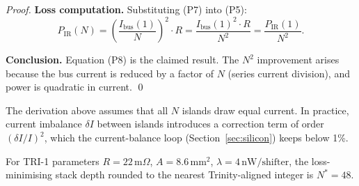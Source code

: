 \begin{proof}
\textbf{Loss computation.}
Substituting (P7) into (P5):
\[
  P_{\mathrm{IR}}(N) = \left(\frac{I_{\mathrm{bus}}(1)}{N}\right)^2 \cdot R
                     = \frac{I_{\mathrm{bus}}(1)^2 \cdot R}{N^2}
                     = \frac{P_{\mathrm{IR}}(1)}{N^2}. \tag{P8}
\]

\textbf{Conclusion.}
Equation (P8) is the claimed result.  The $N^2$ improvement arises
because the bus current is reduced by a factor of $N$ (series current
division), and power is quadratic in current.  \qed
\end{proof}

\begin{remark}
The derivation above assumes that all $N$ islands draw equal current.
In practice, current imbalance $\delta I$ between islands introduces a
correction term of order $(\delta I / I)^2$, which the current-balance
loop (Section~\ref{sec:silicon}) keeps below 1\%.
\end{remark}

\begin{theorem}
\label{thm:opt_48}
For TRI-1 parameters $R = 22\,\mathrm{m}\Omega$, $A = 8.6\,\mathrm{mm}^2$,
$\lambda = 4\,\mathrm{nW}/\mathrm{shifter}$, the loss-minimising stack depth
rounded to the nearest Trinity-aligned integer is $N^* = 48$.
\end{theorem}

